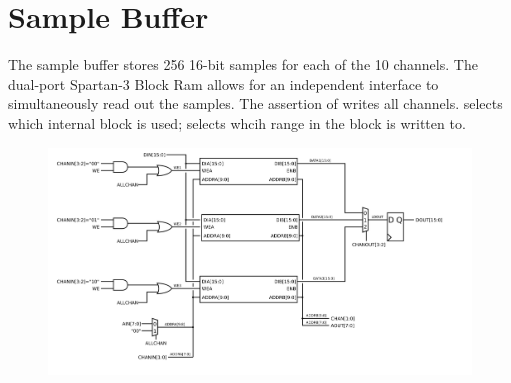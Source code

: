 
\section{Sample Buffer}

The sample buffer stores 256 16-bit samples for each of the 10 channels. The dual-port Spartan-3 Block Ram allows for an independent interface to simultaneously read out the samples. The assertion of  writes all channels.  selects which internal block is used;  selects whcih range in the block is written to. 

\begin{figure}
\includegraphics[scale=1.0]{samplebuffer.svg}
\end{figure}
